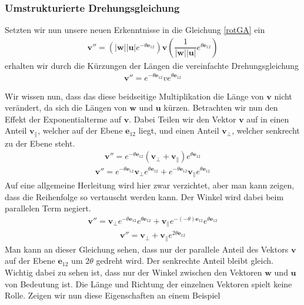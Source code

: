 \subsubsection{Umstrukturierte Drehungsgleichung}
Setzten wir nun unsere neuen Erkenntnisse in die Gleichung \eqref{rotGA} ein
\begin{align}
	\mathbf{v''} = (|\mathbf{w}||\mathbf{u}|e^{-\theta \mathbf{e}_{12}}) \mathbf{v}( \dfrac{1}{|\mathbf{w}||\mathbf{u}|}e^{\theta \mathbf{e}_{12}})
\end{align}
erhalten wir durch die Kürzungen der Längen die vereinfachte Drehungsgleichung
\begin{align}
	\mathbf{v''} = e^{-\theta \mathbf{e}_{12}} v e^{\theta \mathbf{e}_{12}}
\end{align}

Wir wissen nun, dass das diese beidseitige Multiplikation die Länge von $\mathbf{v}$ nicht verändert, da sich die Längen von $\mathbf{w}$ und $\mathbf{u}$ kürzen. Betrachten wir nun den Effekt der Exponentialterme auf $\mathbf{v}$. Dabei Teilen wir den Vektor $\mathbf{v}$ auf in einen Anteil $\mathbf{v_\parallel}$, welcher auf der Ebene $\mathbf{e}_{12}$ liegt, und einen Anteil $\mathbf{v_\perp}$, welcher senkrecht zu der Ebene steht.
\begin{align} \label{RotAufPerpPar}
	\mathbf{v}'' = e^{-\theta \mathbf{e}_{12}} (\mathbf{v_\perp + v_\parallel}) e^{\theta \mathbf{e}_{12}}
\end{align}
\begin{align}
	\mathbf{v}'' = e^{-\theta \mathbf{e}_{12}} \mathbf{v_\perp} e^{\theta \mathbf{e}_{12}} + e^{-\theta \mathbf{e}_{12}} \mathbf{v_\parallel} e^{\theta \mathbf{e}_{12}}
\end{align}
Auf eine allgemeine Herleitung wird hier zwar verzichtet, aber man kann zeigen, dass die Reihenfolge so vertauscht werden kann. Der Winkel wird dabei beim parallelen Term negiert.
\begin{align}
	\mathbf{v}'' = \mathbf{v_\perp} e^{-\theta \mathbf{e}_{12}}  e^{\theta \mathbf{e}_{12}} +  \mathbf{v_\parallel} e^{-(-\theta) \mathbf{e}_{12}} e^{\theta \mathbf{e}_{12}}
\end{align}
\begin{align}
	\mathbf{v}'' = \mathbf{v_\perp} +  \mathbf{v_\parallel} e^{2\theta \mathbf{e}_{12}}
\end{align}
Man kann an dieser Gleichung sehen, dass nur der parallele Anteil des Vektors $\mathbf{v}$ auf der Ebene $\mathbf{e}_{12}$ um $2\theta$ gedreht wird. Der senkrechte Anteil bleibt gleich. Wichtig dabei zu sehen ist, dass nur der Winkel zwischen den Vektoren $\mathbf{w}$ und $\mathbf{u}$ von Bedeutung ist. Die Länge und Richtung der einzelnen Vektoren spielt keine Rolle. Zeigen wir nun diese Eigenschaften an einem Beispiel
